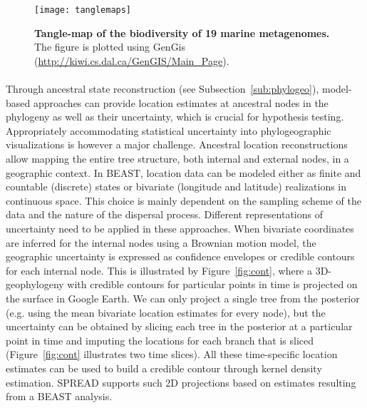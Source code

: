 \begin{figure}[h!]
\centering
\texttt{[image: tanglemaps]}
\caption{
{ \footnotesize 
{\bf Tangle-map of the biodiversity of 19 marine metagenomes.} 
The figure is plotted using GenGis (\url{http://kiwi.cs.dal.ca/GenGIS/Main_Page}).
} %
}
\label{fig:tanglemaps}
\end{figure}

\paragraph{}
Through ancestral state reconstruction (see Subsection~\ref{sub:phylogeo}), model-based approaches can provide location estimates at ancestral nodes in the phylogeny as well as their uncertainty, which is crucial for hypothesis testing.
Appropriately accommodating statistical uncertainty into phylogeographic visualizations is however a major challenge.
Ancestral location reconstructions allow mapping the entire tree structure, both internal and external nodes, in a geographic context.
In BEAST, location data can be modeled either as finite and countable (discrete) states or bivariate (longitude and latitude) realizations in continuous space.
This choice is mainly dependent on the sampling scheme of the data and the nature of the dispersal process.
Different representations of uncertainty need to be applied in these approaches.
When bivariate coordinates are inferred for the internal nodes using a Brownian motion model, the geographic uncertainty is expressed as confidence envelopes or credible contours for each internal node.
This is illustrated by Figure~\ref{fig:cont}, where a 3D-geophylogeny with credible contours for particular points in time is projected on the surface in Google Earth.
We can only project a single tree from the posterior (e.g. using the mean bivariate location estimates for every node), but the uncertainty can be obtained by slicing each tree in the posterior at a particular point in time and imputing the locations for each branch that is sliced (Figure~\ref{fig:cont} illustrates two time slices).
All these time-specific location estimates can be used to build a credible contour through kernel density estimation.
SPREAD supports such 2D projections based on estimates resulting from a BEAST analysis.


